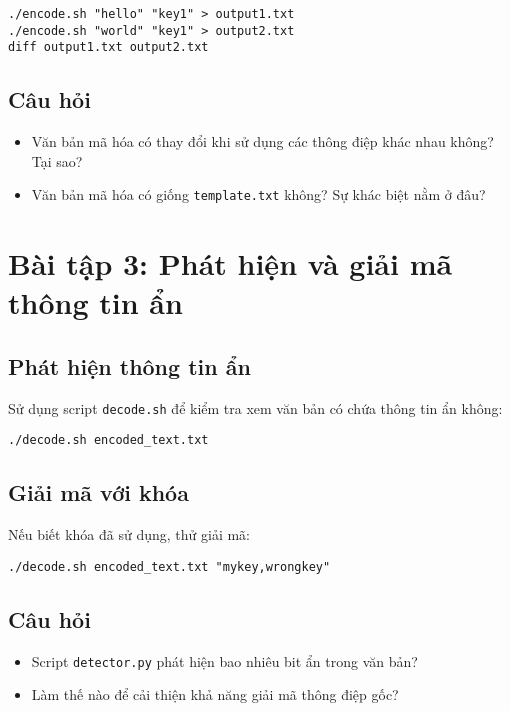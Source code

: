 \documentclass{article}
\begin{document}
\begin{lstlisting}
./encode.sh "hello" "key1" > output1.txt
./encode.sh "world" "key1" > output2.txt
diff output1.txt output2.txt
\end{lstlisting}

\subsection{Câu hỏi}
\begin{itemize}
    \item Văn bản mã hóa có thay đổi khi sử dụng các thông điệp khác nhau không? Tại sao?
    \item Văn bản mã hóa có giống \texttt{template.txt} không? Sự khác biệt nằm ở đâu?
\end{itemize}

\section{Bài tập 3: Phát hiện và giải mã thông tin ẩn}
\subsection{Phát hiện thông tin ẩn}
Sử dụng script \texttt{decode.sh} để kiểm tra xem văn bản có chứa thông tin ẩn không:

\begin{lstlisting}
./decode.sh encoded_text.txt
\end{lstlisting}

\subsection{Giải mã với khóa}
Nếu biết khóa đã sử dụng, thử giải mã:

\begin{lstlisting}
./decode.sh encoded_text.txt "mykey,wrongkey"
\end{lstlisting}

\subsection{Câu hỏi}
\begin{itemize}
    \item Script \texttt{detector.py} phát hiện bao nhiêu bit ẩn trong văn bản?
    \item Làm thế nào để cải thiện khả năng giải mã thông điệp gốc?
\end{itemize}
\end{document}
